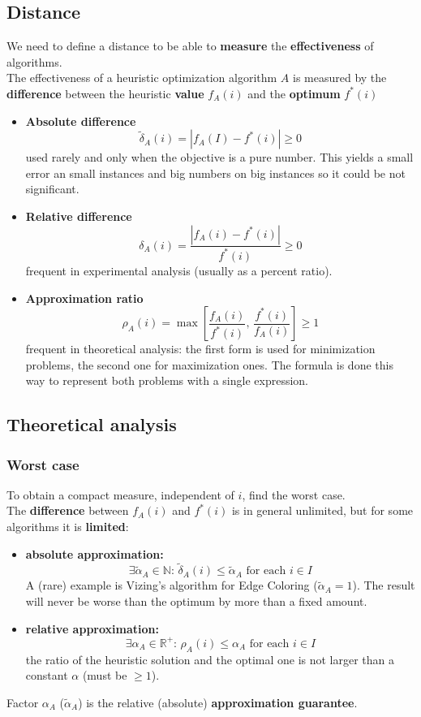 \documentclass[11pt]{article}
\begin{document}
	\newpage
	
	\subsection{Distance} 
	We need to define a distance to be able to \textbf{measure} the \textbf{effectiveness} of algorithms.\\
	The effectiveness of a heuristic optimization algorithm $A$ is measured by the \textbf{difference} between the heuristic \textbf{value} $f_A (i)$ and the \textbf{optimum} $f^\ast (i)$
	\begin{itemize}
		\item \textbf{Absolute difference}
		$$ \tilde{\delta}_A (i) = |f_A(I) - f^\ast (i)| \geq 0 $$
		used rarely and only when the objective is a pure number. This yields a small error an small instances and big numbers on big instances so it could be not significant.
		\item \textbf{Relative difference}
		$$ \delta_A (i) = \frac{|f_A (i) - f^\ast (i)|}{f^\ast (i)} \geq 0$$
		frequent in experimental analysis (usually as a percent ratio).
		\item \textbf{Approximation ratio}
		$$ \rho_A (i) = \max \left[\frac{f_A(i)}{f^\ast(i)}, \, \frac{f^\ast (i)}{f_A (i)}\right] \geq 1 $$
		frequent in theoretical analysis: the first form is used for minimization problems, the second one for maximization ones. The formula is done this way to represent both problems with a single expression.
	\end{itemize}
	
	\newpage
	
	\subsection{Theoretical analysis}
	\subsubsection{Worst case}
	To obtain a compact measure, independent of $i$, find the worst case.\\
	
	The \textbf{difference} between $f_A (i)$ and $f^\ast(i)$ is in general unlimited, but for some algorithms it is \textbf{limited}:
	\begin{itemize}
		\item \textbf{absolute approximation:}
		$$ \exists \tilde{\alpha}_A \in \mathbb{N} : \, \tilde{\delta}_A (i) \leq \tilde{\alpha}_A \text{ for each } i \in I $$
		A (rare) example is Vizing's algorithm for Edge Coloring ($\tilde{\alpha}_A = 1$). The result will never be worse than the optimum by more than a fixed amount.
		\item \textbf{relative approximation:}
		$$ \exists \alpha_A \in \mathbb{R}^+ : \, \rho_A (i) \leq \alpha_A \text{ for each } i \in I $$
		the ratio of the heuristic solution and the optimal one is not larger than a constant $\alpha$ (must be $\geq 1$).
	\end{itemize}
	Factor $\alpha_A$ ($\tilde{\alpha}_A$) is the relative (absolute) \textbf{approximation guarantee}.\\
	
\end{document}

